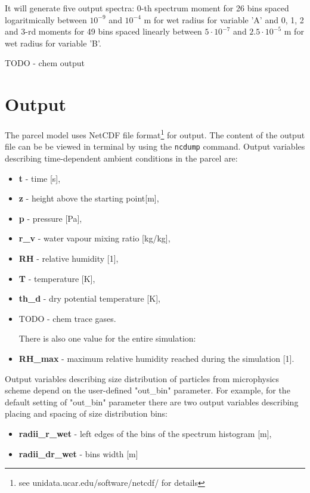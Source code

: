 \documentclass[11pt]{article}
\newcommand{\prog}[1]{{\tt#1}}
\begin{document}
\begin{itemize}
\vspace{0.35cm}
   It will generate five output spectra:
      0-th spectrum moment for 26 bins spaced logaritmically between $10^{-9}$ and $10^{-4}$ m for wet radius for variable 'A' and 
      0, 1, 2 and 3-rd moments for 49 bins spaced linearly between $5\cdot10^{-7}$ and $2.5\cdot10^{-5}$ m for wet radius for variable 'B'.

    TODO - chem output

\end{itemize}

\section{Output}

The parcel model uses NetCDF file format\footnote{see unidata.ucar.edu/software/netcdf/ for details} for output.
The content of the output file can be be viewed in terminal by using the \prog{ncdump} command.
Output variables describing time-dependent ambient conditions in the parcel are:

\begin{itemize}
  \item \textbf{t} - time [s],
  \item \textbf{z} - height above the starting point[m],
  \item \textbf{p} - pressure [Pa],
  \item \textbf{r\_v} - water vapour mixing ratio [kg/kg],
  \item \textbf{RH} - relative humidity [1],
  \item \textbf{T} - temperature [K],
  \item \textbf{th\_d} - dry potential temperature [K],
  \item TODO - chem trace gases.

There is also one value for the entire simulation:

\item \textbf{RH\_{max}} - maximum relative humidity reached during the simulation [1].

\end{itemize}

\noindent
Output variables describing size distribution of particles from microphysics scheme depend 
  on the user-defined "out\_bin" parameter.
For example, for the default setting of "out\_bin" parameter there are two output variables 
  describing placing and spacing of size distribution bins:

\begin{itemize}
  \item \textbf{radii\_r\_wet} - left edges of the bins of the spectrum histogram [m],
  \item \textbf{radii\_dr\_wet} - bins width [m]
\end{itemize}
\end{document}
